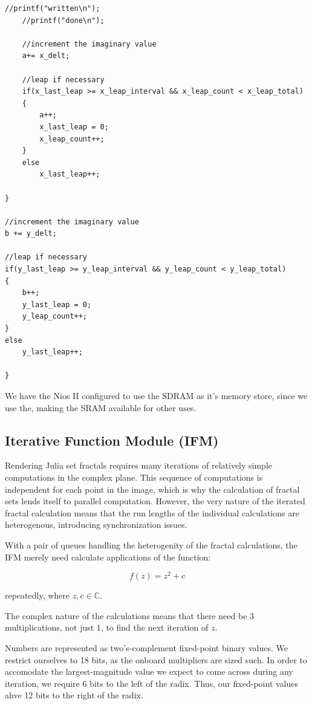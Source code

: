 \documentclass{article}
\begin{document}
\begin{lstlisting}[caption="Window Generation Procedure"]
    //printf("written\n");
    //printf("done\n");           
   
    //increment the imaginary value
    a+= x_delt;           
   
    //leap if necessary
    if(x_last_leap >= x_leap_interval && x_leap_count < x_leap_total)
    {
        a++;
        x_last_leap = 0;
        x_leap_count++;
    }
    else
        x_last_leap++;          
   
}

//increment the imaginary value
b += y_delt;

//leap if necessary
if(y_last_leap >= y_leap_interval && y_leap_count < y_leap_total)
{
    b++;
    y_last_leap = 0;
    y_leap_count++;
}
else
    y_last_leap++;

}
\end{lstlisting}

We have the Nios II configured to use the SDRAM as it's memory store,
since we use the, making the SRAM available for other uses.



\subsection{Iterative Function Module (IFM)}

Rendering Julia set fractals requires many iterations of relatively
simple computations in the complex plane. This sequence of
computations is independent for each point in the image, which is why
the calculation of fractal sets lends itself to parallel
computation. However, the very nature of the iterated fractal
calculation means that the run lengths of the individual calculations
are heterogenous, introducing synchronization issues.

With a pair of queues handling the heterogenity of the fractal
calculations, the IFM merely need calculate applications of the function:

\begin{equation}
f(z) = z^2 + c
\end{equation}

repeatedly, where $z,c \in \mathbb{C}$.

The complex nature of the calculations means that there need be 3
multiplications, not just 1, to find the next iteration of $z$.

Numbers are represented as two's-complement fixed-point binary
values. We restrict ourselves to 18 bits, as the onboard multipliers
are sized such. In order to accomodate the largest-magnitude value we
expect to come across during any iteration, we require 6 bits to the
left of the radix. Thus, our fixed-point values ahve 12 bits to the
right of the radix.
\end{document}
